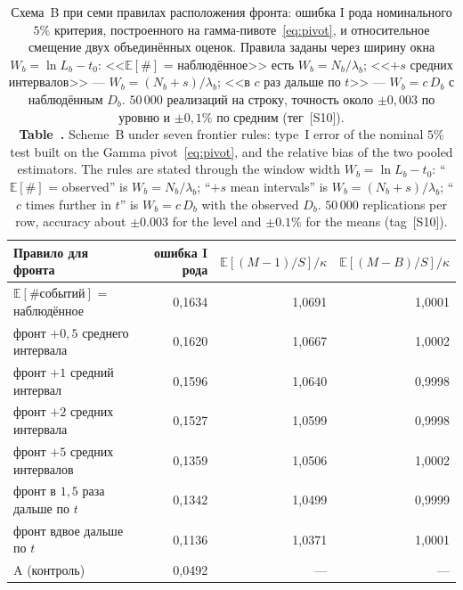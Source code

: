 \documentclass[11pt,a4paper]{article}
\newcommand{\encaptab}[1]{\\[3pt]\foreignlanguage{english}{%
  \textbf{Table~\thetable.} #1}}
\theoremstyle{plain}
\theoremstyle{remark}
\begin{document}
\begin{table}[t]
\centering
\caption{Схема~B при семи правилах расположения фронта: ошибка I рода
номинального $5\%$ критерия, построенного на гамма-пивоте~\eqref{eq:pivot}, и
относительное смещение двух объединённых оценок. Правила заданы через ширину окна
$W_b=\ln L_b-t_0$: <<$\mathbb E[\#]$ = наблюдённое>> есть $W_b=N_b/\lambda_b$;
<<$+s$ средних интервалов>> --- $W_b=(N_b+s)/\lambda_b$; <<в $c$ раз дальше по $t$>>
--- $W_b=c\,D_b$ с наблюдённым $D_b$. $50\,000$ реализаций на строку, точность
около $\pm0{,}003$ по уровню и $\pm0{,}1\%$ по средним (тег~[S10]).
\encaptab{Scheme~B under seven frontier rules: type~I error of the nominal $5\%$
test built on the Gamma pivot~\eqref{eq:pivot}, and the relative bias of the two
pooled estimators. The rules are stated through the window width
$W_b=\ln L_b-t_0$: ``$\mathbb E[\#]$ = observed'' is $W_b=N_b/\lambda_b$;
``$+s$ mean intervals'' is $W_b=(N_b+s)/\lambda_b$; ``$c$ times further in $t$''
is $W_b=c\,D_b$ with the observed $D_b$. $50\,000$ replications per row, accuracy
about $\pm0.003$ for the level and $\pm0.1\%$ for the means (tag~[S10]).}}
\label{tab:calib}
\small
\begin{tabular}{lrrr}
\toprule
Правило для фронта & ошибка I рода & $\mathbb E[(M{-}1)/S]/\kappa$
& $\mathbb E[(M{-}B)/S]/\kappa$\\
\midrule
$\mathbb E[\#\text{событий}]$ = наблюдённое & 0{,}1634 & 1{,}0691 & 1{,}0001\\
фронт $+0{,}5$ среднего интервала & 0{,}1620 & 1{,}0667 & 1{,}0002\\
фронт $+1$ средний интервал & 0{,}1596 & 1{,}0640 & 0{,}9998\\
фронт $+2$ средних интервала & 0{,}1527 & 1{,}0599 & 0{,}9998\\
фронт $+5$ средних интервалов & 0{,}1359 & 1{,}0506 & 1{,}0002\\
фронт в $1{,}5$ раза дальше по $t$ & 0{,}1342 & 1{,}0499 & 0{,}9999\\
фронт вдвое дальше по $t$ & 0{,}1136 & 1{,}0371 & 1{,}0001\\
\midrule
A (контроль) & 0{,}0492 & --- & ---\\
\bottomrule
\end{tabular}
\end{table}
\end{document}
